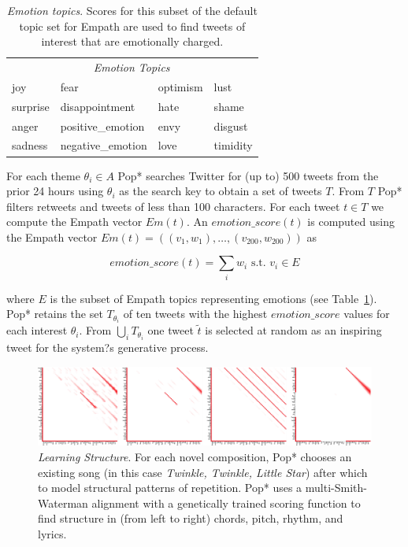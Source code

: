 \documentclass[phd,electronic,oneside,twosidetoc,letterpaper,chaptercenter,parttop,lof,lot]{byumsphd}
\begin{document}
\begin{table}
\centering
\begin{tabular}{llll}
         & \multicolumn{2}{c}{\textit{Emotion Topics}} &                \\
joy      & fear                      & optimism        & lust           \\
surprise & disappointment             & hate            & shame          \\
anger    & positive\_emotion         & envy            &  disgust\\
sadness  & negative\_emotion         & love            & timidity      
\end{tabular}
\caption{\textit{Emotion topics}. Scores for this subset of the default topic set for Empath \citep{Fast2016} are used to find tweets of interest that are emotionally charged.}
\label{tab:empath_emotions}
\end{table}

For each theme $\theta_i \in A$ Pop* searches Twitter for (up to) 500 tweets from the prior 24 hours using $\theta_i$ as the search key to obtain a set of tweets $T$. From $T$ Pop* filters retweets and tweets of less than 100 characters. For each tweet $t\in T$ we compute the Empath vector $Em(t)$. An $emotion\_score(t)$ is computed using the Empath vector $Em(t)=((v_1,w_1),\dots,(v_{200},w_{200}))$ as

\[
emotion\_score(t) = \sum_i w_i \text{ s.t. } v_i\in E
\]

\noindent where $E$ is the subset of Empath topics representing emotions (see Table~\ref{tab:empath_emotions}). Pop* retains the set $T_{\theta_i}$ of ten tweets with the highest $emotion\_score$ values for each interest $\theta_i$. From $\bigcup_i T_{\theta_i}$ one tweet $\tilde{t}$ is selected at random as an inspiring tweet for the system?s generative process.

\begin{figure}
    \centering
    \includegraphics[width=\linewidth]{structure}
    \caption{\textit{Learning Structure}. For each novel composition, Pop* chooses an existing song (in this case \textit{Twinkle, Twinkle, Little Star}) after which to model structural patterns of repetition. Pop* uses a multi-Smith-Waterman alignment with a genetically trained scoring function to find structure in (from left to right) chords, pitch, rhythm, and lyrics.}
    \label{fig:structure}
\end{figure}
\end{document}
